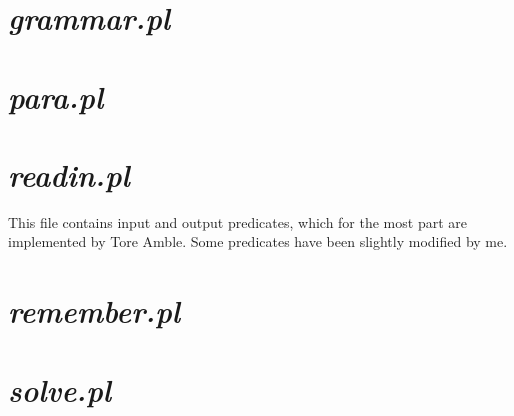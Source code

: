 \newpage

\section*{\em grammar.pl}

\begin{tgrind}
  
\end{tgrind}

\newpage

\section*{\em para.pl}

\begin{tgrind}
  
\end{tgrind}

\newpage

\section*{\em readin.pl}

This file contains input and output predicates, which for the most
part are implemented by Tore Amble. Some predicates have been slightly
modified by me.

\vspace*{0.5cm}
\begin{tgrind}
  
\end{tgrind}

\newpage

\section*{\em remember.pl}

\begin{tgrind}
  
\end{tgrind}

\newpage

\section*{\em solve.pl}

\begin{tgrind}
  
\end{tgrind}
